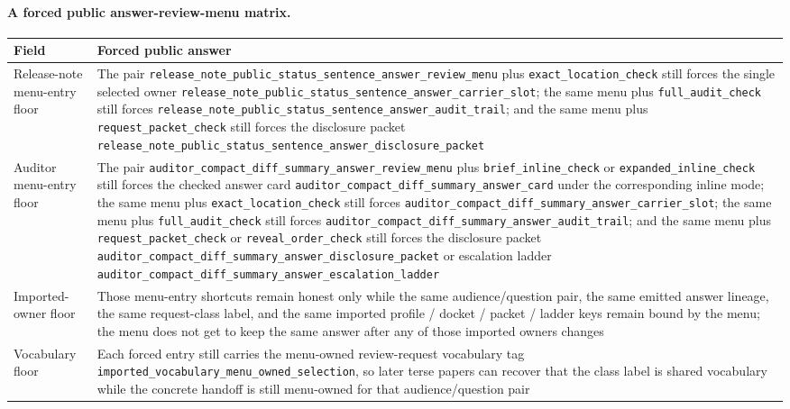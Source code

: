 \documentclass[11pt]{article}
\begin{document}
\paragraph{A forced public answer-review-menu matrix.}
\begin{table}[t]
\centering
\small
\begin{tabularx}{\linewidth}{@{}lX@{}}
\toprule
Field & Forced public answer \\
\midrule
Release-note menu-entry floor & The pair \nolinkurl{release_note_public_status_sentence_answer_review_menu} plus \nolinkurl{exact_location_check} still forces the single selected owner \nolinkurl{release_note_public_status_sentence_answer_carrier_slot}; the same menu plus \nolinkurl{full_audit_check} still forces \nolinkurl{release_note_public_status_sentence_answer_audit_trail}; and the same menu plus \nolinkurl{request_packet_check} still forces the disclosure packet \nolinkurl{release_note_public_status_sentence_answer_disclosure_packet} \\
Auditor menu-entry floor & The pair \nolinkurl{auditor_compact_diff_summary_answer_review_menu} plus \nolinkurl{brief_inline_check} or \nolinkurl{expanded_inline_check} still forces the checked answer card \nolinkurl{auditor_compact_diff_summary_answer_card} under the corresponding inline mode; the same menu plus \nolinkurl{exact_location_check} still forces \nolinkurl{auditor_compact_diff_summary_answer_carrier_slot}; the same menu plus \nolinkurl{full_audit_check} still forces \nolinkurl{auditor_compact_diff_summary_answer_audit_trail}; and the same menu plus \nolinkurl{request_packet_check} or \nolinkurl{reveal_order_check} still forces the disclosure packet \nolinkurl{auditor_compact_diff_summary_answer_disclosure_packet} or escalation ladder \nolinkurl{auditor_compact_diff_summary_answer_escalation_ladder} \\
Imported-owner floor & Those menu-entry shortcuts remain honest only while the same audience/question pair, the same emitted answer lineage, the same request-class label, and the same imported profile / docket / packet / ladder keys remain bound by the menu; the menu does not get to keep the same answer after any of those imported owners changes \\
Vocabulary floor & Each forced entry still carries the menu-owned review-request vocabulary tag \nolinkurl{imported_vocabulary_menu_owned_selection}, so later terse papers can recover that the class label is shared vocabulary while the concrete handoff is still menu-owned for that audience/question pair \\

\end{tabularx}
\end{table}
\end{document}
